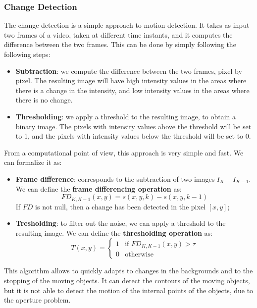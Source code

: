 \subsubsection{Change Detection}
The change detection is a simple approach to motion detection. 
It takes as input two frames of a video, taken at different time instants, and it computes the difference between the two frames.
This can be done by simply following the following steps:
\begin{itemize}
    \item \textbf{Subtraction}: we compute the difference between the two frames, pixel by pixel.
    The resulting image will have high intensity values in the areas where there is a change in the intensity, and low intensity values in the areas where there is no change.
    \item \textbf{Thresholding}: we apply a threshold to the resulting image, to obtain a binary image. The pixels with intensity values above the threshold
    will be set to 1, and the pixels with intensity values below the threshold will be set to 0.
\end{itemize}
From a computational point of view, this approach is very simple and fast. We can formalize it as:
\begin{itemize}
    \item \textbf{Frame difference}: corresponds to the subtraction of two images $I_K - I_{K-1}$.
    We can define the \textbf{frame differencing operation} as:
    \begin{equation}
    \label{eq:frame_difference}
        FD_{K, K-1}(x, y) = s(x, y, k) - s(x, y, k-1)
    \end{equation}
    If $FD$ is not null, then a change has been detected in the pixel $[x, y]$;
    \item \textbf{Tresholding}: to filter out the noise, we can apply a threshold to the resulting image. We can define the \textbf{thresholding operation} as:
    \begin{equation}    
        \label{eq:thresholding}
        T(x, y) = \begin{cases}
            1 & \text{if } FD_{K, K-1}(x, y) > \tau \\
            0 & \text{otherwise}
        \end{cases}
    \end{equation}
\end{itemize}
This algorithm allows to quickly adapts to changes in the backgrounds and to the stopping of the moving objects.
It can detect the contours of the moving objects, but it is not able to detect the motion of the internal points of the objects, due to the aperture problem.

